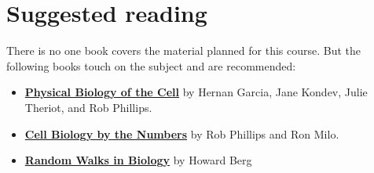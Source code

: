 \documentclass[a4]{book}
\begin{document}
\section*{Suggested reading}
There is no one book covers the material planned for this course.
But the following books touch on the subject and are recommended:
\begin{itemize}
	\item \href{https://www.google.com/url?sa=t&rct=j&q=&esrc=s&source=web&cd=1&cad=rja&uact=8&ved=2ahUKEwjd4-XS6tfkAhVI2qQKHSBoDFUQFjAAegQIAhAB&url=https%3A%2F%2Fwww.crcpress.com%2FPhysical-Biology-of-the-Cell%2FPhillips-Kondev-Theriot-Garcia%2Fp%2Fbook%2F9780815344506&usg=AOvVaw1S0mgI830cAwjb4G48vKPF}{\bf Physical Biology of the Cell} by Hernan Garcia, Jane Kondev, Julie Theriot, and Rob Phillips.
	\item \href{http://book.bionumbers.org/}{\bf Cell Biology by the Numbers} by Rob Phillips and Ron Milo.
	\item \href{https://press.princeton.edu/titles/112.html}{\bf Random Walks in Biology} by Howard Berg
\end{itemize}


















\end{document}
